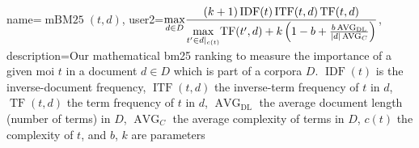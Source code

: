 %
%
%
%
%
%
% 


\makeglossaries

{
    name={\ensuremath{\operatorname{mBM25}(t,d)}},
    user2={$\displaystyle\protect\underset{d \in D}{\operatorname{max}} \frac{\left( k + 1 \right) \operatorname{IDF}(t) \operatorname{ITF}(t,d) \operatorname{TF}(t,d)}{\protect\underset{t' \in d|_{c(t)}}{\operatorname{max}}\! \operatorname{TF}(t',d) + k \left( 1-b + \frac{b \operatorname{AVG}_{\mathrm{DL}}}{|d| \operatorname{AVG}_{C}} \right)}$},
    description={Our mathematical \gls{bm25} ranking to measure the importance of a given \gls{moi} $t$ in a document $d \in D$ which is part of a corpora $D$. $\operatorname{IDF}(t)$ is the inverse-document frequency, $\operatorname{ITF}(t,d)$ the inverse-term frequency of $t$ in $d$, $\operatorname{TF}(t,d)$ the term frequency of $t$ in $d$, $\operatorname{AVG}_{\mathrm{DL}}$ the average document length (number of terms) in $D$, $\operatorname{AVG}_{C}$ the average complexity of terms in $D$, $c(t)$ the complexity of $t$, and $b$, $k$ are parameters}
}

